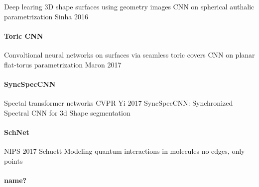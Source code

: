 \documentclass[pdftex,10pt,a4paper]{scrartcl}
\begin{document}
Deep learing 3D shape surfaces using geometry images
CNN on spherical authalic parametrization
Sinha 2016

\paragraph{Toric CNN}

Convoltional neural networks on surfaces via seamless toric covers
CNN on planar flat-torus parametrization
Maron 2017

\paragraph{SyncSpecCNN}

Spectal transformer networks
CVPR
Yi 2017
SyncSpecCNN: Synchronized Spectral CNN for 3d Shape segmentation

\paragraph{SchNet}

NIPS 2017
Schuett
Modeling quantum interactions in molecules
no edges, only points

\paragraph{name?}



\end{document}
